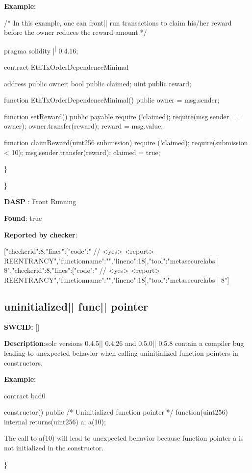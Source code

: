 \documentclass{article}
\begin{document}
\textbf{Example:} 
\begin{ffcode} 

/* In this example, one can front|\textendash| run transactions to claim his/her reward before the owner reduces the reward amount.*/ 

pragma solidity |\textsuperscript| 0.4.16;

contract EthTxOrderDependenceMinimal {
    address public owner;
    bool public claimed;
    uint public reward;

    function EthTxOrderDependenceMinimal() public {
        owner = msg.sender;
    }

    function setReward() public payable {
        require (!claimed);
        require(msg.sender == owner);
        owner.transfer(reward);
        reward = msg.value;
    }

    function claimReward(uint256 submission) {
        require (!claimed);
        require(submission < 10);
        msg.sender.transfer(reward);
        claimed = true;
    }
}

\end{ffcode} 
\} 

\} 

\textbf{DASP} : Front Running

\textbf{Found}: true

\textbf{Reported by checker}: 
\begin{ffcode} 

[{"checker\textunderscore id":8,"lines":[{"code":"      // <yes> <report> REENTRANCY\n","function\textunderscore name":"","line\textunderscore no":18}],"tool":"metasecurelabs|\textendash| 8"},{"checker\textunderscore id":8,"lines":[{"code":"      // <yes> <report> REENTRANCY\n","function\textunderscore name":"","line\textunderscore no":18}],"tool":"metasecurelabs|\textendash| 8"}]
\end{ffcode} 
\subsection{uninitialized{|\textunderscore| }func{|\textunderscore| }pointer} 
\textbf{SWC{\textunderscore }ID:} []

\textbf{Description}:solc versions 0.4.5|\textendash| 0.4.26 and 0.5.0|\textendash| 0.5.8 contain a compiler bug leading to unexpected behavior when calling uninitialized function pointers in constructors.


\textbf{Example:} 
\begin{ffcode} 

contract bad0 {

  constructor() public {
    /* Uninitialized function pointer */
    function(uint256) internal returns(uint256) a;
    a(10);
  }
}

The call to a(10) will lead to unexpected behavior because function pointer a is not initialized in the constructor.

\end{ffcode} 
\} 
\end{document}
